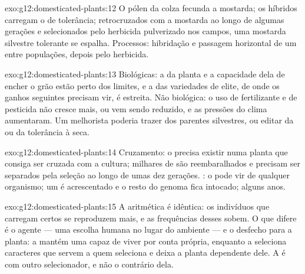 \begin{solution}{exo:g12:domesticated-plants:12}
O pólen da colza fecunda a mostarda; os híbridos carregam o  de
tolerância; retrocruzados com a mostarda ao longo de algumas gerações e
selecionados pelo herbicida pulverizado nos campos, uma mostarda
silvestre tolerante se espalha. Processos: hibridação e passagem
horizontal de um  entre populações, depois  pelo herbicida.
\end{solution}

\begin{solution}{exo:g12:domesticated-plants:13}
Biológicas: a  da planta e a capacidade dela de encher o
grão estão perto dos limites, e a  das variedades
de elite, de onde os ganhos seguintes precisam vir, é estreita. Não
biológica: o uso de fertilizante e de pesticida não cresce mais, ou
vem sendo reduzido, e as pressões do clima aumentaram. Um melhorista
poderia trazer  dos parentes silvestres, ou editar  da
 ou da tolerância à seca.
\end{solution}

\begin{solution}{exo:g12:domesticated-plants:14}
Cruzamento: o  precisa existir numa planta que consiga ser cruzada
com a cultura; milhares de  são reembaralhados e precisam ser
separados pela seleção ao longo de umas dez gerações. : o
 pode vir de qualquer organismo; um  é acrescentado e o resto
do genoma fica intocado; alguns anos.
\end{solution}

\begin{solution}{exo:g12:domesticated-plants:15}
A aritmética é idêntica: os indivíduos que carregam certos  se
reproduzem mais, e as frequências desses  sobem. O que difere é o
agente --- uma escolha humana no lugar do ambiente --- e o desfecho
para a planta: a  mantém uma  capaz de viver por
conta própria, enquanto a  seleciona caracteres que servem
a quem seleciona e deixa a planta dependente dele. A  é
 com outro selecionador, e não o contrário dela.
\end{solution}

